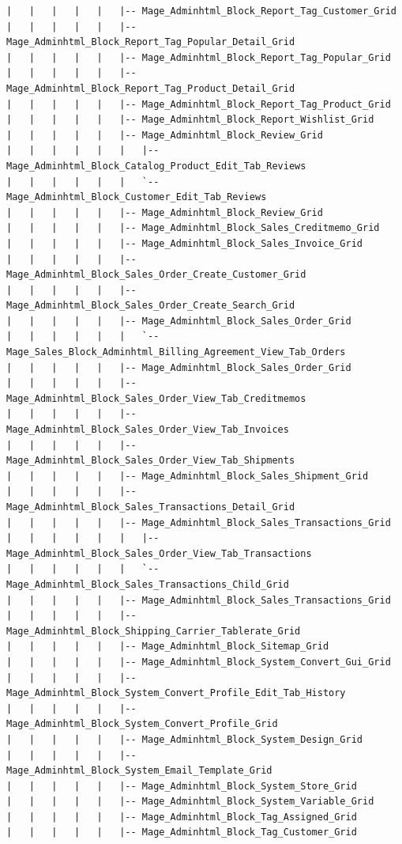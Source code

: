 \documentclass[oneside]{book}
\begin{document}
\begin{lstlisting}
|   |   |   |   |   |-- Mage_Adminhtml_Block_Report_Tag_Customer_Grid
|   |   |   |   |   |-- Mage_Adminhtml_Block_Report_Tag_Popular_Detail_Grid
|   |   |   |   |   |-- Mage_Adminhtml_Block_Report_Tag_Popular_Grid
|   |   |   |   |   |-- Mage_Adminhtml_Block_Report_Tag_Product_Detail_Grid
|   |   |   |   |   |-- Mage_Adminhtml_Block_Report_Tag_Product_Grid
|   |   |   |   |   |-- Mage_Adminhtml_Block_Report_Wishlist_Grid
|   |   |   |   |   |-- Mage_Adminhtml_Block_Review_Grid
|   |   |   |   |   |   |-- Mage_Adminhtml_Block_Catalog_Product_Edit_Tab_Reviews
|   |   |   |   |   |   `-- Mage_Adminhtml_Block_Customer_Edit_Tab_Reviews
|   |   |   |   |   |-- Mage_Adminhtml_Block_Review_Grid
|   |   |   |   |   |-- Mage_Adminhtml_Block_Sales_Creditmemo_Grid
|   |   |   |   |   |-- Mage_Adminhtml_Block_Sales_Invoice_Grid
|   |   |   |   |   |-- Mage_Adminhtml_Block_Sales_Order_Create_Customer_Grid
|   |   |   |   |   |-- Mage_Adminhtml_Block_Sales_Order_Create_Search_Grid
|   |   |   |   |   |-- Mage_Adminhtml_Block_Sales_Order_Grid
|   |   |   |   |   |   `-- Mage_Sales_Block_Adminhtml_Billing_Agreement_View_Tab_Orders
|   |   |   |   |   |-- Mage_Adminhtml_Block_Sales_Order_Grid
|   |   |   |   |   |-- Mage_Adminhtml_Block_Sales_Order_View_Tab_Creditmemos
|   |   |   |   |   |-- Mage_Adminhtml_Block_Sales_Order_View_Tab_Invoices
|   |   |   |   |   |-- Mage_Adminhtml_Block_Sales_Order_View_Tab_Shipments
|   |   |   |   |   |-- Mage_Adminhtml_Block_Sales_Shipment_Grid
|   |   |   |   |   |-- Mage_Adminhtml_Block_Sales_Transactions_Detail_Grid
|   |   |   |   |   |-- Mage_Adminhtml_Block_Sales_Transactions_Grid
|   |   |   |   |   |   |-- Mage_Adminhtml_Block_Sales_Order_View_Tab_Transactions
|   |   |   |   |   |   `-- Mage_Adminhtml_Block_Sales_Transactions_Child_Grid
|   |   |   |   |   |-- Mage_Adminhtml_Block_Sales_Transactions_Grid
|   |   |   |   |   |-- Mage_Adminhtml_Block_Shipping_Carrier_Tablerate_Grid
|   |   |   |   |   |-- Mage_Adminhtml_Block_Sitemap_Grid
|   |   |   |   |   |-- Mage_Adminhtml_Block_System_Convert_Gui_Grid
|   |   |   |   |   |-- Mage_Adminhtml_Block_System_Convert_Profile_Edit_Tab_History
|   |   |   |   |   |-- Mage_Adminhtml_Block_System_Convert_Profile_Grid
|   |   |   |   |   |-- Mage_Adminhtml_Block_System_Design_Grid
|   |   |   |   |   |-- Mage_Adminhtml_Block_System_Email_Template_Grid
|   |   |   |   |   |-- Mage_Adminhtml_Block_System_Store_Grid
|   |   |   |   |   |-- Mage_Adminhtml_Block_System_Variable_Grid
|   |   |   |   |   |-- Mage_Adminhtml_Block_Tag_Assigned_Grid
|   |   |   |   |   |-- Mage_Adminhtml_Block_Tag_Customer_Grid

\end{lstlisting}
\end{document}
